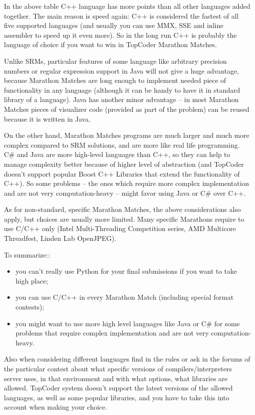 In the above table C++ language has more points than all other languages
added together. The main reason is speed again: C++ is considered the
fastest of all five supported languages (and usually you can use MMX,
SSE and inline assembler to speed up it even more). So in the long run
C++ is probably the language of choice if you want to win in TopCoder
Marathon Matches.

Unlike SRMs, particular features of some language like arbitrary
precision numbers or regular expression support in Java will not give a
huge advantage, because Marathon Matches are long enough to implement
needed piece of functionality in any language (although it can be handy
to have it in standard library of a language). Java has another minor
advantage -- in most Marathon Matches pieces of visualizer code
(provided as part of the problem) can be reused because it is written in
Java.

On the other hand, Marathon Matches programs are much larger and much
more complex compared to SRM solutions, and are more like real life
programming. C\# and Java are more high-level languages than C++, so
they can help to manage complexity better because of higher level of
abstraction (and TopCoder doesn't support popular Boost C++ Libraries
that extend the functionality of C++). So some problems -- the ones
which require more complex implementation and are not very
computation-heavy -- might favor using Java or C\# over C++.

As for non-standard, specific Marathon Matches, the above considerations
also apply, but choices are usually more limited. Many specific
Marathons require to use C/C++ only (Intel Multi-Threading Competition
series, AMD Multicore Threadfest, Linden Lab OpenJPEG).

To summarize::

\begin{itemize}
\item
  you can't really use Python for your final submissions if you want to
  take high place;
\item
  you can use C/C++ in every Marathon Match (including special format
  contests);
\item
  you might want to use more high level languages like Java or C\# for
  some problems that require complex implementation and are not very
  computation-heavy.
\end{itemize}

Also when considering different languages find in the rules or ask in
the forums of the particular contest about what specific versions of
compilers/interpreters server uses, in that environment and with what
options, what libraries are allowed. TopCoder system doesn't support the
latest versions of the allowed languages, as well as some popular
libraries, and you have to take this into account when making your
choice.

